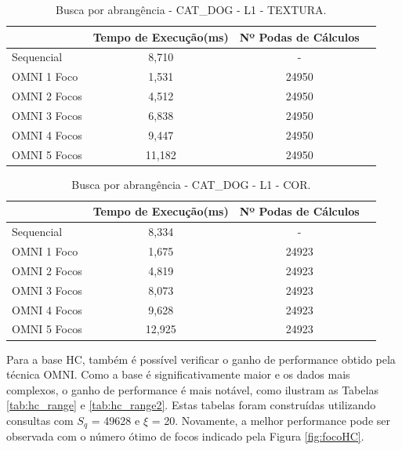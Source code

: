 \begin{table}[H]
    \centering
    \caption[Busca por abrangência - CAT\_DOG - L1 - TEXTURA]{Busca por abrangência - CAT\_DOG - L1 - TEXTURA.
    \label{tab:cd_range_text}}
   \begin{tabular}{l c c c}
        \toprule
            &Tempo de Execução(ms)&Nº Podas de Cálculos\\
        \midrule
            Sequencial & 8,710 & - \\
            OMNI 1 Foco & 1,531 & 24950 \\
            OMNI 2 Focos & 4,512 & 24950 \\
            OMNI 3 Focos & 6,838 & 24950 \\
            OMNI 4 Focos & 9,447 & 24950 \\
            OMNI 5 Focos & 11,182 & 24950 \\
        \bottomrule
    \end{tabular}
\end{table}

\begin{table}[H]
    \centering
    \caption[Busca por abrangência - CAT\_DOG - L1 - COR]{Busca por abrangência - CAT\_DOG - L1 - COR.
    \label{tab:cd_range_color}}
   \begin{tabular}{l c c c}
        \toprule
            &Tempo de Execução(ms)&Nº Podas de Cálculos\\
        \midrule
            Sequencial & 8,334 & - \\
            OMNI 1 Foco & 1,675 & 24923 \\
            OMNI 2 Focos & 4,819 & 24923 \\
            OMNI 3 Focos & 8,073 & 24923 \\
            OMNI 4 Focos & 9,628 & 24923 \\
            OMNI 5 Focos & 12,925 & 24923 \\
        \bottomrule
    \end{tabular}
\end{table}

Para a base HC, também é possível verificar o ganho de performance obtido pela técnica OMNI. Como a base é significativamente maior e os dados mais complexos, o ganho
de performance é mais notável, como ilustram as Tabelas \ref{tab:hc_range} e \ref{tab:hc_range2}. Estas tabelas foram construídas utilizando consultas com $S_q$ = 49628 e $\xi$ = 20.
Novamente, a melhor performance pode ser observada com o número ótimo de focos indicado pela Figura \ref{fig:focoHC}.

